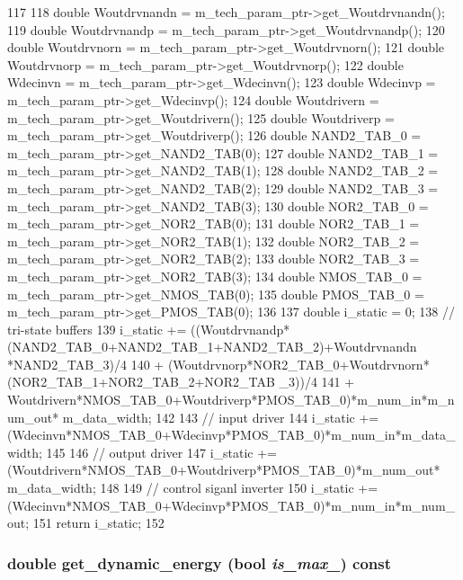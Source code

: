 \begin{DoxyCode}
117 {
118     double Woutdrvnandn = m_tech_param_ptr->get_Woutdrvnandn();
119     double Woutdrvnandp = m_tech_param_ptr->get_Woutdrvnandp();
120     double Woutdrvnorn = m_tech_param_ptr->get_Woutdrvnorn();
121     double Woutdrvnorp = m_tech_param_ptr->get_Woutdrvnorp();
122     double Wdecinvn = m_tech_param_ptr->get_Wdecinvn();
123     double Wdecinvp = m_tech_param_ptr->get_Wdecinvp();
124     double Woutdrivern = m_tech_param_ptr->get_Woutdrivern();
125     double Woutdriverp = m_tech_param_ptr->get_Woutdriverp();
126     double NAND2_TAB_0 = m_tech_param_ptr->get_NAND2_TAB(0);
127     double NAND2_TAB_1 = m_tech_param_ptr->get_NAND2_TAB(1);
128     double NAND2_TAB_2 = m_tech_param_ptr->get_NAND2_TAB(2);
129     double NAND2_TAB_3 = m_tech_param_ptr->get_NAND2_TAB(3);
130     double NOR2_TAB_0 = m_tech_param_ptr->get_NOR2_TAB(0);
131     double NOR2_TAB_1 = m_tech_param_ptr->get_NOR2_TAB(1);
132     double NOR2_TAB_2 = m_tech_param_ptr->get_NOR2_TAB(2);
133     double NOR2_TAB_3 = m_tech_param_ptr->get_NOR2_TAB(3);
134     double NMOS_TAB_0 = m_tech_param_ptr->get_NMOS_TAB(0);
135     double PMOS_TAB_0 = m_tech_param_ptr->get_PMOS_TAB(0);
136 
137     double i_static = 0;
138     // tri-state buffers
139     i_static += ((Woutdrvnandp*(NAND2_TAB_0+NAND2_TAB_1+NAND2_TAB_2)+Woutdrvnandn
      *NAND2_TAB_3)/4
140             + (Woutdrvnorp*NOR2_TAB_0+Woutdrvnorn*(NOR2_TAB_1+NOR2_TAB_2+NOR2_TAB
      _3))/4
141             + Woutdrivern*NMOS_TAB_0+Woutdriverp*PMOS_TAB_0)*m_num_in*m_num_out*
      m_data_width;
142 
143     // input driver
144     i_static += (Wdecinvn*NMOS_TAB_0+Wdecinvp*PMOS_TAB_0)*m_num_in*m_data_width;
145 
146     // output driver
147     i_static += (Woutdrivern*NMOS_TAB_0+Woutdriverp*PMOS_TAB_0)*m_num_out*
      m_data_width;
148 
149     // control siganl inverter
150     i_static += (Wdecinvn*NMOS_TAB_0+Wdecinvp*PMOS_TAB_0)*m_num_in*m_num_out;
151     return i_static;
152 }
\end{DoxyCode}
\hypertarget{classMatrixCrossbar_a912bfef03e3ce71b4bbc0b5136b087f5}{
\subsubsection[{get\_\-dynamic\_\-energy}]{\setlength{\rightskip}{0pt plus 5cm}double get\_\-dynamic\_\-energy (bool {\em is\_\-max\_\-}) const}}
\label{classMatrixCrossbar_a912bfef03e3ce71b4bbc0b5136b087f5}


